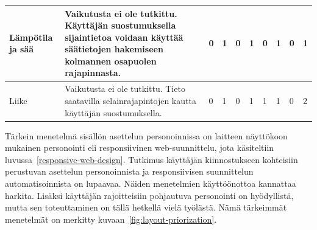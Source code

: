 \documentclass[finnish, 12pt, a4paper, elec, utf8, a-1b, online]{aaltothesis}
\begin{document}
{\begin{longtable}{p{2.5cm}|p{6cm}|p{0.5cm}p{0.5cm}p{0.5cm}|p{0.5cm}|p{0.5cm}p{0.5cm}p{0.5cm}|p{0.5cm}|}
    \midrule
    Lämpötila ja sää                        & Vaikutusta ei ole tutkittu. Käyttäjän suostumuksella sijaintietoa voidaan käyttää säätietojen hakemiseen kolmannen osapuolen rajapinnasta.                                                                                                                                                                                                                              & 0                                          & 1                                   & 0                                      & 1                            & 0                                               & 1                                         & 0                                         & 1                            \\
    \midrule
    Liike                                   & Vaikutusta ei ole tutkittu. Tieto saatavilla selainrajapintojen kautta käyttäjän suostumuksella.                                                                                                                                                                                                                                                                        & 0                                          & 1                                   & 0                                      & 1                            & 1                                               & 1                                         & 0                                         & 2                            \\
\end{longtable}
}

Tärkein menetelmä sisällön asettelun personoinnissa on laitteen näyttökoon
mukainen personointi eli responsiivinen web-suunnittelu, jota käsiteltiin
luvussa~\ref{responsive-web-design}. Tutkimus käyttäjän kiinnostukseen
kohteisiin perustuvan asettelun personoinnista ja responsiivisen suunnittelun
automatisoinnista on lupaavaa. Näiden menetelmien käyttöönottoa kannattaa
harkita. Lisäksi käyttäjän rajoitteisiin pohjautuva personointi on hyödyllistä,
mutta sen toteuttaminen on tällä hetkellä vielä työlästä. Nämä tärkeimmät
menetelmät on merkitty kuvaan~\ref{fig:layout-priorization}.
\end{document}
